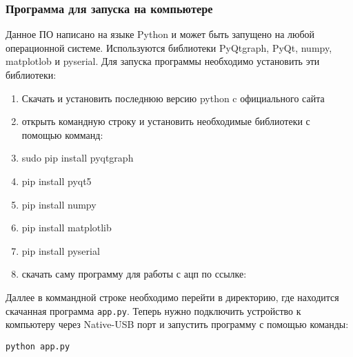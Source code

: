 \documentclass[../main.tex]{subfiles}
\begin{document}
\subsubsection{Программа для запуска на компьютере}
Данное ПО написано на языке Python и может быть запущено на любой операционной системе. Используются библиотеки PyQtgraph, PyQt, numpy, matplotlob и pyserial. Для запуска программы необходимо установить эти библиотеки:
\begin{enumerate}
  \item Скачать и установить последнюю версию python c официального сайта\cite{python}
  \item открыть командную строку и установить необходимые библиотеки с помощью комманд:
  \item sudo pip install pyqtgraph
  \item pip install pyqt5
  \item pip install numpy
  \item pip install matplotlib
  \item pip install pyserial
  \item скачать саму программу для работы с ацп по ссылке: \cite{app-due}
\end{enumerate}

Даллее в коммандной строке необходимо перейти в директорию, где находится скачанная программа \lstinline|app.py|. Теперь нужно подключить устройство к компьютеру через Native-USB порт и запустить программу с помощью команды:

\lstinline|python app.py|

\newpage
\end{document}

